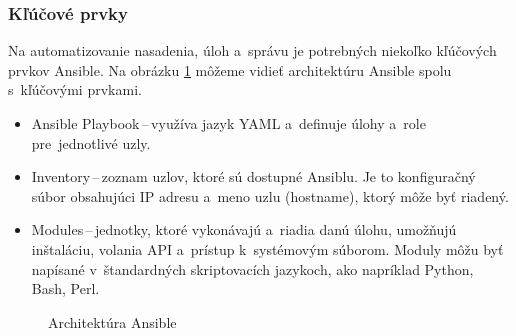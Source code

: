 \subsubsection*{Kľúčové prvky}
Na automatizovanie nasadenia, úloh a~správu je potrebných niekoľko kľúčových prvkov Ansible. Na obrázku \ref{ansible_scheme} môžeme vidieť architektúru Ansible spolu s~kľúčovými prvkami.

\begin{itemize}
	\item Ansible Playbook\,--\,využíva jazyk YAML a~definuje úlohy a~role pre~jednotlivé uzly.
	\item Inventory\,--\,zoznam uzlov, ktoré sú dostupné Ansiblu. Je to konfiguračný súbor obsahujúci IP adresu a~meno uzlu (hostname), ktorý môže byť riadený.
	\item Modules\,--\,jednotky, ktoré vykonávajú a~riadia danú úlohu, umožňujú inštaláciu, volania API a~prístup k~systémovým súborom. Moduly môžu byť napísané v~štandardných skriptovacích jazykoch, ako napríklad \mbox{Python}, Bash, Perl. 
\end{itemize}

\begin{figure}[H]
	\begin{center}
		\caption{Architektúra Ansible \cite{ansible}}
		\label{ansible_scheme}
	\end{center}
\end{figure}

